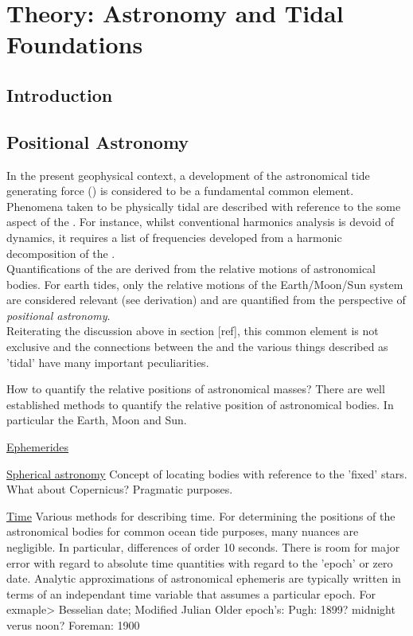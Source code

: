 \newpage
\section{Theory: Astronomy and Tidal Foundations}  \label{S:THEORY_TIDE} 

\subsection{Introduction}


\subsection{Positional Astronomy}

In the present geophysical context, a development of the astronomical tide generating force (\ATGF)  is considered to be a fundamental common element.  Phenomena taken to be physically tidal are described with reference to the some aspect of the \ATGF.  For instance, whilst conventional harmonics analysis is devoid of dynamics, it requires a list of frequencies developed from a harmonic decomposition of the \ATGF.\\ 

Quantifications of the \ATGF are derived from the relative motions of astronomical bodies.  For earth tides, only the relative motions of the Earth/Moon/Sun system are considered relevant (see derivation) and are quantified from the perspective of \textit{positional astronomy}.\\
Reiterating the discussion above in section [ref], this common element is not exclusive and the connections between the \ATGF and the various things described as 'tidal' have many important peculiarities.  

How to quantify the relative positions of astronomical masses?
There are well established methods to quantify the relative position of astronomical bodies.  In particular the Earth, Moon and Sun.

\underline{Ephemerides} 


\underline{Spherical astronomy}
Concept of locating bodies with reference to the 'fixed' stars.  
What about Copernicus?  Pragmatic purposes.

\underline{Time}
Various methods for describing time.  
For determining the positions of the astronomical bodies for common ocean tide purposes, many nuances are negligible.  In particular, differences of order 10 seconds.
There is room for major error with regard to absolute time quantities with regard to the 'epoch' or zero date.
Analytic approximations of astronomical ephemeris are typically written in terms of an independant time variable that assumes a particular epoch.
For exmaple>
Besselian date;
Modified Julian
Older epoch's:
Pugh: 1899?  midnight verus noon?
Foreman: 1900 

